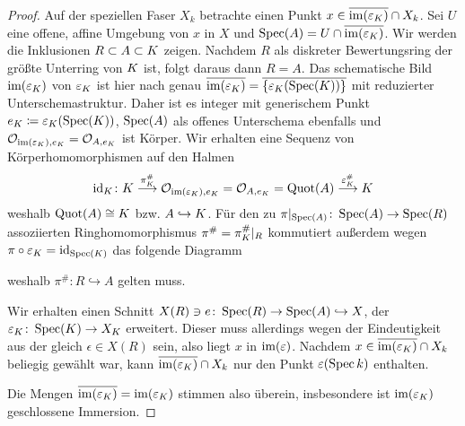 \documentclass[german, bibliography=totoc]{scrreprt}
\begin{document}
\begin{Bemerkung}
\begin{proof}
    Auf der speziellen Faser $X_k$ betrachte einen Punkt
    $x\in\overline{\operatorname{im}(\varepsilon_{K})}\cap X_k$. Sei $U$ eine
    offene, affine Umgebung von $x$ in $X$ und
    $\operatorname{Spec}(A)=U\cap\overline{\operatorname{im}(\varepsilon_{K})}$.
    Wir werden die Inklusionen $R\subset A\subset K$ zeigen.
    Nachdem $R$ als diskreter Bewertungsring der größte Unterring
    von $K$ ist, folgt daraus dann $R=A$.
    Das schematische Bild $\text{im}(\varepsilon_{K})$ von $\varepsilon_{K}$ ist
    hier nach \cite[Remark 10.32]{wedhorn} genau
    $\overline{\operatorname{im}(\varepsilon_{K})}=\overline{\{\varepsilon_{K}(\operatorname{Spec}(K))\}}$
    mit reduzierter Unterschemastruktur. Daher ist es integer mit
    generischem Punkt $e_{K}\coloneqq\varepsilon_{K}(\operatorname{Spec}(K))$,
    $\operatorname{Spec}(A)$ als offenes Unterschema ebenfalls und
    $\mathcal{O}_{\text{im}(\varepsilon_{K}), e_{K}}=\mathcal{O}_{A,e_{K}}$ ist Körper.
    Wir erhalten eine Sequenz von Körperhomomorphismen auf den Halmen
    \begin{gather*}
      \mathrm{id}_{K}\colon
      K \overset{\pi_{K}^\#}{\longrightarrow}
      \mathcal{O}_{\text{im}(\varepsilon_{K}), e_{K}} = \mathcal{O}_{A,e_{K}} = \operatorname{Quot}(A)
      \overset{\varepsilon_{K}^\#}{\longrightarrow} K
    \end{gather*}
    weshalb $\operatorname{Quot}(A)\cong K$ bzw. $A\hookrightarrow K$.
    Für den zu $\pi|_{\operatorname{Spec}(A)}\colon\operatorname{Spec}(A)\to\operatorname{Spec}(R)$ assoziierten
    Ringhomomorphismus $\pi^\#=\pi_{K}^\#|_R$ kommutiert außerdem wegen
    $\pi\circ\varepsilon_{K}=\mathrm{id}_{\operatorname{Spec}(K)}$ das folgende Diagramm
    \begin{center}
    \end{center}
    weshalb $\pi^\#\colon R\hookrightarrow A$ gelten muss.
    
    Wir erhalten einen Schnitt
    $X(R)\ni e\colon\operatorname{Spec}(R)\to\operatorname{Spec}(A)\hookrightarrow X$,
    der $\varepsilon_{K}\colon\operatorname{Spec}(K)\to X_{K}$ erweitert.
    Dieser muss allerdings wegen der Eindeutigkeit aus der \NAbbEig
    gleich $\epsilon\in X(R)$ sein, also liegt $x$ in $\operatorname{im}(\varepsilon)$.
    Nachdem $x\in \overline{\operatorname{im}(\varepsilon_{K})}\cap X_k$ beliegig
    gewählt war, kann $\overline{\operatorname{im}(\varepsilon_{K})}\cap X_k$ nur den
    Punkt $\varepsilon(\operatorname{Spec} k)$ enthalten.

    Die Mengen $\overline{\operatorname{im}(\varepsilon_{K})}=\operatorname{im}(\varepsilon_{K})$ stimmen
    also überein, insbesondere ist $\operatorname{im}(\varepsilon_{K})$ geschlossene
    Immersion.
  \end{proof}
\end{Bemerkung}
\end{document}

